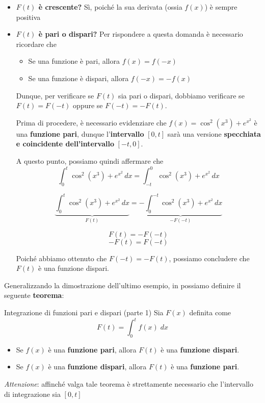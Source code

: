 \documentclass[a4paper, 12pt]{report}
\begin{document}
\begin{itemize}
        \item \textbf{$F(t)$ è crescente?} Sì, poiché la sua derivata (ossia $f(x)$) è sempre positiva
        
        \item \textbf{$F(t)$ è pari o dispari?} Per rispondere a questa domanda è necessario ricordare che
        \begin{itemize}
            \item Se una funzione è pari, allora $f(x) = f(-x)$
            \item Se una funzione è dispari, allora $f(-x) = -f(x)$
        \end{itemize}
        Dunque, per verificare se $F(t)$ sia pari o dispari, dobbiamo verificare se $F(t) = F(-t)$ oppure se $F(-t) = -F(t)$.
        
        Prima di procedere, è necessario evidenziare che $f(x) = \cos^2(x^3) + e^{x^2}$ è una \textbf{funzione pari}, dunque l'\textbf{intervallo} $[0, t]$ sarà una versione \textbf{specchiata e coincidente dell'intervallo }$[-t, 0]$.
        
        A questo punto, possiamo quindi affermare che 
        \[ \int_{0}^{t} \cos^2(x^3)+e^{x^2} \, dx = \int_{-t}^{0} \cos^2(x^3)+e^{x^2} \, dx \]
        
        \[ \underbrace{\int_{0}^{t} \cos^2(x^3)+e^{x^2} \, dx}_{F(t)} = \underbrace{- \int_{0}^{-t} \cos^2(x^3)+e^{x^2} \, dx}_{-F(-t)}\]
        
        \[ F(t) = -F(-t)\]
        \[ -F(t) = F(-t)\]
        
        Poiché abbiamo ottenuto che $F(-t) = -F(t)$, possiamo concludere che $F(t)$ è una funzione dispari.
        
    \end{itemize}
    
    \quad
    
    Generalizzando la dimostrazione dell'ultimo esempio, in  possiamo definire il seguente \textbf{teorema}:
    
    \begin{framedthm}{Integrazione di funzioni pari e dispari (parte 1)}
        Sia $F(x)$ definita come
        \[ F(t) = \int_{0}^{t} f(x) \; dx \]
        
        \begin{itemize}
            \item Se $f(x)$ è una \textbf{funzione pari}, allora $F(t)$ è una \textbf{funzione dispari}.
            
            \item Se $f(x)$ è una \textbf{funzione dispari}, allora $F(t)$ è una \textbf{funzione pari}.
            
        \end{itemize}
        
        \textit{Attenzione}: affinché valga tale teorema è strettamente necessario che l'intervallo di integrazione sia $[0, t]$
    \end{framedthm}
    
\end{document}
